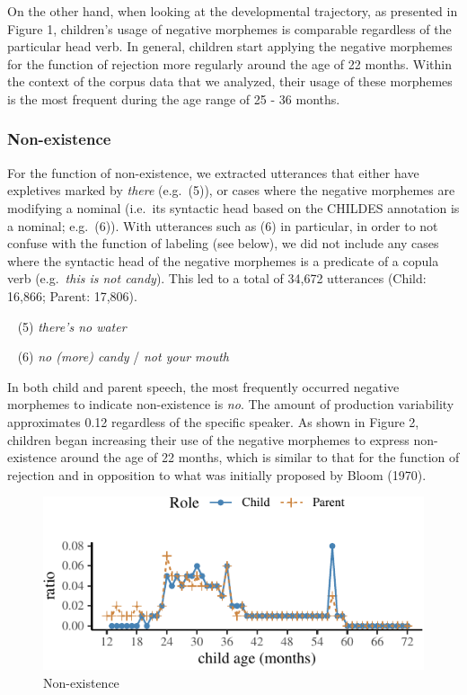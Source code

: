 \documentclass[10pt, letterpaper]{article}
\newenvironment{CodeChunk}{}{}
\begin{document}
On the other hand, when looking at the developmental trajectory, as
presented in Figure 1, children's usage of negative morphemes is
comparable regardless of the particular head verb. In general, children
start applying the negative morphemes for the function of rejection more
regularly around the age of 22 months. Within the context of the corpus
data that we analyzed, their usage of these morphemes is the most
frequent during the age range of 25 - 36 months.

\hypertarget{non-existence}{%
\subsubsection{Non-existence}\label{non-existence}}

For the function of non-existence, we extracted utterances that either
have expletives marked by \emph{there} (e.g.~(5)), or cases where the
negative morphemes are modifying a nominal (i.e.~its syntactic head
based on the CHILDES annotation is a nominal; e.g.~(6)). With utterances
such as (6) in particular, in order to not confuse with the function of
labeling (see below), we did not include any cases where the syntactic
head of the negative morphemes is a predicate of a copula verb
(e.g.~\emph{this is not candy}). This led to a total of 34,672
utterances (Child: 16,866; Parent: 17,806).

~ (5) \emph{there's no water}

~ (6) \emph{no (more) candy} / \emph{not your mouth}

In both child and parent speech, the most frequently occurred negative
morphemes to indicate non-existence is \emph{no}. The amount of
production variability approximates 0.12 regardless of the specific
speaker. As shown in Figure 2, children began increasing their use of
the negative morphemes to express non-existence around the age of 22
months, which is similar to that for the function of rejection and in
opposition to what was initially proposed by Bloom (1970).

\begin{CodeChunk}
\begin{figure}[H]

{\centering \includegraphics{figs/existence-1} 

}

\caption[Non-existence]{Non-existence}\label{fig:existence}
\end{figure}
\end{CodeChunk}
\end{document}
